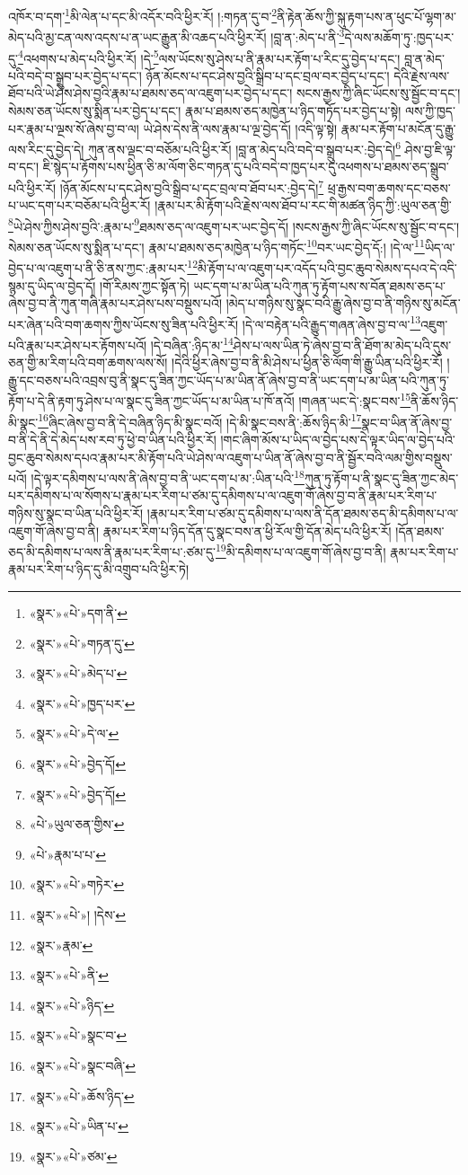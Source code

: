 འཁོར་བ་དག་\footnote{«སྣར་»«པེ་»དག་ནི་}མི་ལེན་པ་དང་མི་འདོར་བའི་ཕྱིར་རོ། །:གཏན་དུ་བ་\footnote{«སྣར་»«པེ་»གཏན་དུ་}ནི་རྟེན་ཆོས་ཀྱི་སྐུ་རྟག་པས་ན་ཕུང་པོ་ལྷག་མ་མེད་པའི་མྱ་ངན་ལས་འདས་པ་ན་ཡང་རྒྱུན་མི་འཆད་པའི་ཕྱིར་རོ། །བླ་ན་:མེད་པ་ནི་\footnote{«སྣར་»«པེ་»མེད་པ་}དེ་ལས་མཆོག་ཏུ་:ཁྱད་པར་དུ་\footnote{«སྣར་»«པེ་»ཁྱད་པར་}འཕགས་པ་མེད་པའི་ཕྱིར་རོ། །དེ་\footnote{«སྣར་»«པེ་»དེ་ལ་}ལས་ཡོངས་སུ་ཤེས་པ་ནི་རྣམ་པར་རྟོག་པ་རིང་དུ་བྱེད་པ་དང་། བླ་ན་མེད་པའི་བདེ་བ་སྒྲུབ་པར་བྱེད་པ་དང་། ཉོན་མོངས་པ་དང་ཤེས་བྱའི་སྒྲིབ་པ་དང་བྲལ་བར་བྱེད་པ་དང་། དེའི་རྗེས་ལས་ཐོབ་པའི་ཡེ་ཤེས་ཤེས་བྱའི་རྣམ་པ་ཐམས་ཅད་ལ་འཇུག་པར་བྱེད་པ་དང་། སངས་རྒྱས་ཀྱི་ཞིང་ཡོངས་སུ་སྦྱོང་བ་དང་། སེམས་ཅན་ཡོངས་སུ་སྨིན་པར་བྱེད་པ་དང་། རྣམ་པ་ཐམས་ཅད་མཁྱེན་པ་ཉིད་གཏོད་པར་བྱེད་པ་སྟེ། ལས་ཀྱི་ཁྱད་པར་རྣམ་པ་ལྔས་སོ་ཞེས་བྱ་བ་ལ། ཡེ་ཤེས་དེས་ནི་ལས་རྣམ་པ་ལྔ་བྱེད་དོ། །འདི་ལྟ་སྟེ། རྣམ་པར་རྟོག་པ་མངོན་དུ་རྒྱུ་ལས་རིང་དུ་བྱེད་དེ། ཀུན་ནས་ལྡང་བ་བཅོམ་པའི་ཕྱིར་རོ། །བླ་ན་མེད་པའི་བདེ་བ་སྒྲུབ་པར་:བྱེད་དེ།\footnote{«སྣར་»«པེ་»བྱེད་དོ།} ཤེས་བྱ་ཇི་ལྟ་བ་དང་། ཇི་སྙེད་པ་རྟོགས་པས་ཕྱིན་ཅི་མ་ལོག་ཅིང་གཏན་དུ་པའི་བདེ་བ་ཁྱད་པར་དུ་འཕགས་པ་ཐམས་ཅད་སྒྲུབ་པའི་ཕྱིར་རོ། །ཉོན་མོངས་པ་དང་ཤེས་བྱའི་སྒྲིབ་པ་དང་བྲལ་བ་ཐོབ་པར་:བྱེད་དེ།\footnote{«སྣར་»«པེ་»བྱེད་དོ།} ཕྲ་རྒྱས་བག་ཆགས་དང་བཅས་པ་ཡང་དག་པར་བཅོམ་པའི་ཕྱིར་རོ། །རྣམ་པར་མི་རྟོག་པའི་རྗེས་ལས་ཐོབ་པ་རང་གི་མཚན་ཉིད་ཀྱི་:ཡུལ་ཅན་གྱི་\footnote{«པེ་»ཡུལ་ཅན་གྱིས་}ཡེ་ཤེས་ཀྱིས་ཤེས་བྱའི་:རྣམ་པ་\footnote{«པེ་»རྣམ་པ་པ་}ཐམས་ཅད་ལ་འཇུག་པར་ཡང་བྱེད་དོ། །སངས་རྒྱས་ཀྱི་ཞིང་ཡོངས་སུ་སྦྱོང་བ་དང་། སེམས་ཅན་ཡོངས་སུ་སྨིན་པ་དང་། རྣམ་པ་ཐམས་ཅད་མཁྱེན་པ་ཉིད་གཏོང་\footnote{«སྣར་»«པེ་»གཏེར་}བར་ཡང་བྱེད་དོ:། །དེ་ལ་\footnote{«སྣར་»«པེ་»། །དེས་}ཡིད་ལ་བྱེད་པ་ལ་འཇུག་པ་ནི་ཅི་ནས་ཀྱང་:རྣམ་པར་\footnote{«སྣར་»རྣམ་}མི་རྟོག་པ་ལ་འཇུག་པར་འདོད་པའི་བྱང་ཆུབ་སེམས་དཔའ་དེ་འདི་སྙམ་དུ་ཡིད་ལ་བྱེད་དོ། །གོ་རིམས་ཀྱང་སྟོན་ཏེ། ཡང་དག་པ་མ་ཡིན་པའི་ཀུན་ཏུ་རྟོག་པས་ས་བོན་ཐམས་ཅད་པ་ཞེས་བྱ་བ་ནི་ཀུན་གཞི་རྣམ་པར་ཤེས་པས་བསྡུས་པའོ། །མེད་པ་གཉིས་སུ་སྣང་བའི་རྒྱུ་ཞེས་བྱ་བ་ནི་གཉིས་སུ་མངོན་པར་ཞེན་པའི་བག་ཆགས་ཀྱིས་ཡོངས་སུ་ཟིན་པའི་ཕྱིར་རོ། །དེ་ལ་བརྟེན་པའི་རྒྱུད་གཞན་ཞེས་བྱ་བ་ལ་\footnote{«སྣར་»«པེ་»ནི་}འཇུག་པའི་རྣམ་པར་ཤེས་པར་རྟོགས་པའོ། །དེ་བཞིན་:ཉིད་མ་\footnote{«སྣར་»«པེ་»ཉིད་}ཤེས་པ་ལས་ཡིན་ཏེ་ཞེས་བྱ་བ་ནི་ཐོག་མ་མེད་པའི་དུས་ཅན་གྱི་མ་རིག་པའི་བག་ཆགས་ལས་སོ། །དེའི་ཕྱིར་ཞེས་བྱ་བ་ནི་མི་ཤེས་པ་ཕྱིན་ཅི་ལོག་གི་རྒྱུ་ཡིན་པའི་ཕྱིར་རོ། །རྒྱུ་དང་བཅས་པའི་འབྲས་བུ་ནི་སྣང་དུ་ཟིན་ཀྱང་ཡོད་པ་མ་ཡིན་ནོ་ཞེས་བྱ་བ་ནི་ཡང་དག་པ་མ་ཡིན་པའི་ཀུན་ཏུ་རྟོག་པ་དེ་ནི་རྟག་ཏུ་ཤེས་པ་ལ་སྣང་དུ་ཟིན་ཀྱང་ཡོད་པ་མ་ཡིན་པ་ཁོ་ནའོ། །གཞན་ཡང་དེ་:སྣང་བས་\footnote{«སྣར་»«པེ་»སྣང་བ་}ནི་ཆོས་ཉིད་མི་སྣང་\footnote{«སྣར་»«པེ་»སྣང་བཞི་}ཞིང་ཞེས་བྱ་བ་ནི་དེ་བཞིན་ཉིད་མི་སྣང་བའོ། །དེ་མི་སྣང་བས་ནི་:ཆོས་ཉིད་མི་\footnote{«སྣར་»«པེ་»ཆོས་ཉིད་}སྣང་བ་ཡིན་ནོ་ཞེས་བྱ་བ་ནི་དེ་ནི་དེ་མེད་པས་རབ་ཏུ་ཕྱེ་བ་ཡིན་པའི་ཕྱིར་རོ། །གང་ཞིག་མོས་པ་ཡིད་ལ་བྱེད་པས་དེ་ལྟར་ཡིད་ལ་བྱེད་པའི་བྱང་ཆུབ་སེམས་དཔའ་རྣམ་པར་མི་རྟོག་པའི་ཡེ་ཤེས་ལ་འཇུག་པ་ཡིན་ནོ་ཞེས་བྱ་བ་ནི་སྦྱོར་བའི་ལམ་གྱིས་བསྡུས་པའོ། །དེ་ལྟར་དམིགས་པ་ལས་ནི་ཞེས་བྱ་བ་ནི་ཡང་དག་པ་མ་:ཡིན་པའི་\footnote{«སྣར་»«པེ་»ཡིན་པ་}ཀུན་ཏུ་རྟོག་པ་ནི་སྣང་དུ་ཟིན་ཀྱང་མེད་པར་དམིགས་པ་ལ་སོགས་པ་རྣམ་པར་རིག་པ་ཙམ་དུ་དམིགས་པ་ལ་འཇུག་གོ་ཞེས་བྱ་བ་ནི་རྣམ་པར་རིག་པ་གཉིས་སུ་སྣང་བ་ཡིན་པའི་ཕྱིར་རོ། །རྣམ་པར་རིག་པ་ཙམ་དུ་དམིགས་པ་ལས་ནི་དོན་ཐམས་ཅད་མི་དམིགས་པ་ལ་འཇུག་གོ་ཞེས་བྱ་བ་ནི། རྣམ་པར་རིག་པ་ཉིད་དོན་དུ་སྣང་བས་ན་ཕྱི་རོལ་གྱི་དོན་མེད་པའི་ཕྱིར་རོ། །དོན་ཐམས་ཅད་མི་དམིགས་པ་ལས་ནི་རྣམ་པར་རིག་པ་:ཙམ་དུ་\footnote{«སྣར་»«པེ་»ཙམ་}མི་དམིགས་པ་ལ་འཇུག་གོ་ཞེས་བྱ་བ་ནི། རྣམ་པར་རིག་པ་རྣམ་པར་རིག་པ་ཉིད་དུ་མི་འགྲུབ་པའི་ཕྱིར་ཏེ། 